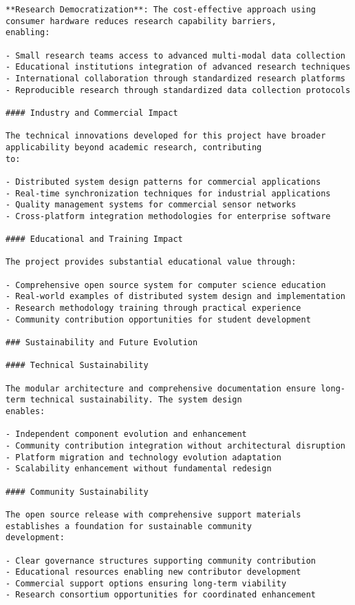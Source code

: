 \documentclass[11pt,a4paper]{report}
\begin{document}
\begin{verbatim}
**Research Democratization**: The cost-effective approach using consumer hardware reduces research capability barriers,
enabling:

- Small research teams access to advanced multi-modal data collection
- Educational institutions integration of advanced research techniques
- International collaboration through standardized research platforms
- Reproducible research through standardized data collection protocols

#### Industry and Commercial Impact

The technical innovations developed for this project have broader applicability beyond academic research, contributing
to:

- Distributed system design patterns for commercial applications
- Real-time synchronization techniques for industrial applications
- Quality management systems for commercial sensor networks
- Cross-platform integration methodologies for enterprise software

#### Educational and Training Impact

The project provides substantial educational value through:

- Comprehensive open source system for computer science education
- Real-world examples of distributed system design and implementation
- Research methodology training through practical experience
- Community contribution opportunities for student development

### Sustainability and Future Evolution

#### Technical Sustainability

The modular architecture and comprehensive documentation ensure long-term technical sustainability. The system design
enables:

- Independent component evolution and enhancement
- Community contribution integration without architectural disruption
- Platform migration and technology evolution adaptation
- Scalability enhancement without fundamental redesign

#### Community Sustainability

The open source release with comprehensive support materials establishes a foundation for sustainable community
development:

- Clear governance structures supporting community contribution
- Educational resources enabling new contributor development
- Commercial support options ensuring long-term viability
- Research consortium opportunities for coordinated enhancement


\end{verbatim}
\end{document}

